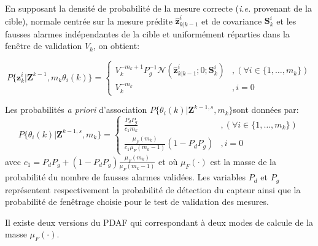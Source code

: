 \documentclass[10pt,french,a4paper]{report}
\begin{document}
	En supposant la densité de probabilité de la mesure correcte (\textit{i.e.} provenant de la cible), normale centrée sur la mesure prédite $\hat{\mathbf{z}}_{k|k-1}^i$ et de covariance $\mathbf{S}_k^i$ et les fausses alarmes indépendantes de la cible et uniformément réparties dans la fenêtre de validation $V_k$, on obtient:
	
	 \begin{equation}
	P\{\mathbf{z}_k^i| \mathbf{Z}^{k-1},m_k \theta_i(k) \} = \left\{ \begin{aligned}
	 V_k^{-m_k+1} P_g^{-1}\mathcal{N}(\hat{\mathbf{z}}_{k|k-1}^i;0;\mathbf{S}_k^i) &,(\forall i \in \{1,\ldots,m_k\}) \\
	 V_k^{-m_k} &, i = 0
	\end{aligned} \right.
	\end{equation}
	
	Les probabilités \textit{a priori} d'association $P\{\theta_i(k)| \mathbf{Z}^{k-1,s},m_k  \}$sont données par:
	 \begin{equation}
	P\{\theta_i(k)| \mathbf{Z}^{k-1,s},m_k  \} = \left\{ \begin{aligned}
	\frac{P_dP_g}{c_1 m_k} &,(\forall i \in \{1,\ldots,m_k\}) \\
	\frac{\mu_F(m_k)}{c_1 \mu_F(m_k-1)}(1-P_dP_g) &, i = 0
	\end{aligned} \right.
	\end{equation}
	avec $c_1 = P_dP_g+(1-P_dP_g)\frac{\mu_F(m_k)}{\mu_F(m_k-1)}$ et où $\mu_F(\cdot)$ est la masse de la probabilité du nombre de fausses alarmes validées. Les variables $P_d$ et $P_g$ représentent respectivement la probabilité de détection du capteur ainsi que la probabilité de fenêtrage choisie pour le test de validation des mesures. 
	
	Il existe deux versions du \acf{PDAF} qui correspondant à deux modes de calcule de la masse $\mu_F(\cdot)$. 
	
\end{document}
